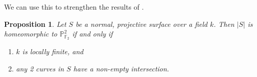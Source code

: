\documentclass{amsart}
\newtheorem{prop}[thm]{Proposition}
\theoremstyle{definition}
\theoremstyle{remark}
\newcommand{\p}[0]{{\mathbb P}}
\newcommand{\f}[0]{{\mathbb F}}
\newcommand{\q}[0]{{\mathbb Q}}
\newcommand{\pic}[0]{\operatorname{Pic}}
\newcommand{\pico}[0]{\operatorname{\mathbf{Pic}}^{\circ}}
\newcommand{\ns}[0]{\operatorname{NS}}
\newcommand{\qrank}[0]{\operatorname{rank}_{\q}}
\newcommand{\coker}[0]{\operatorname{coker}}
\def\into{\DOTSB\lhook\joinrel\to}
\begin{document}










\medskip

We can use this to strengthen the results of \cite{MR624904}.

\begin{prop} \label{quasifinite.field.thm.cor} Let $S$ be a normal, projective surface over a field $k$.
Then $|S|$ is homeomorphic to $\p^2_{\f_2}$ if and only if
\begin{enumerate}
\item $k$ is locally finite, and  
\item any 2 curves in $S$ have a non-empty intersection.
\end{enumerate}
\end{prop}
\end{document}

